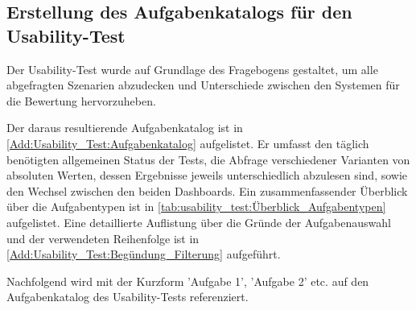 \subsection{Erstellung des Aufgabenkatalogs für den Usability-Test}
\label{ch:Validierung:sec:Material:Usability_Test}

Der Usability-Test wurde auf Grundlage des Fragebogens gestaltet, um alle abgefragten Szenarien abzudecken und Unterschiede zwischen den Systemen für die Bewertung hervorzuheben.

Der daraus resultierende Aufgabenkatalog ist in \autoref{Add:Usability_Test:Aufgabenkatalog} aufgelistet. Er umfasst den täglich benötigten allgemeinen Status der Tests, die Abfrage verschiedener Varianten von absoluten Werten, dessen Ergebnisse jeweils unterschiedlich abzulesen sind, sowie den Wechsel zwischen den beiden Dash\-boards. Ein zusammenfassender Überblick über die Aufgabentypen ist in \autoref{tab:usability_test:Überblick_Aufgabentypen} aufgelistet. Eine detaillierte Auflistung über die Gründe der Aufgabenauswahl und der verwendeten Reihenfolge ist in \autoref{Add:Usability_Test:Begündung_Filterung} aufgeführt.

Nachfolgend wird mit der Kurzform 'Aufgabe 1', 'Aufgabe 2' etc. auf den Aufgabenkatalog des Usability-Tests referenziert.


